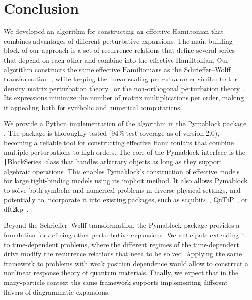 \section{Conclusion}

We developed an algorithm for constructing an effective Hamiltonian that combines advantages of different perturbative expansions.
The main building block of our approach is a set of recurrence relations that define several series that depend on each other and combine into the effective Hamiltonian.
Our algorithm constructs the same effective Hamiltonians as the Schrieffer--Wolff transformation~\cite{Schrieffer_1966}, while keeping the linear scaling per extra order similar to the density matrix perturbation theory~\cite{McWeeny_1962, Truflandier_2020} or the non-orthogonal perturbation theory~\cite{Bloch_1958}.
Its expressions minimize the number of matrix multiplications per order, making it appealing both for symbolic and numerical computations.

We provide a Python implementation of the algorithm in the Pymablock package \cite{Araya_2024}.
The package is thoroughly tested (94\% test coverage as of version 2.0), becoming a reliable tool for constructing effective Hamiltonians that combine multiple perturbations to high orders.
The core of the Pymablock interface is the \texttt|BlockSeries| class that handles arbitrary objects as long as they support algebraic operations.
This enables Pymablock's construction of effective models for large tight-binding models using its implicit method.
It also allows Pymablock to solve both symbolic and numerical problems in diverse physical settings, and potentially to incorporate it into existing packages, such as scqubits~\cite{Groszkowski_2021}, QuTiP~\cite{Johansson_2012,Johansson_2013}, or dft2kp~\cite{Cassiano_2024}.

Beyond the Schrieffer--Wolff transformation, the Pymablock package provides a foundation for defining other perturbative expansions.
We anticipate extending it to time-dependent problems, where the different regimes of the time-dependent drive modify the recurrence relations that need to be solved.
Applying the same framework to problems with weak position dependence would allow to construct a nonlinear response theory of quantum materials.
Finally, we expect that in the many-particle context the same framework supports implementing different flavors of diagrammatic expansions.
